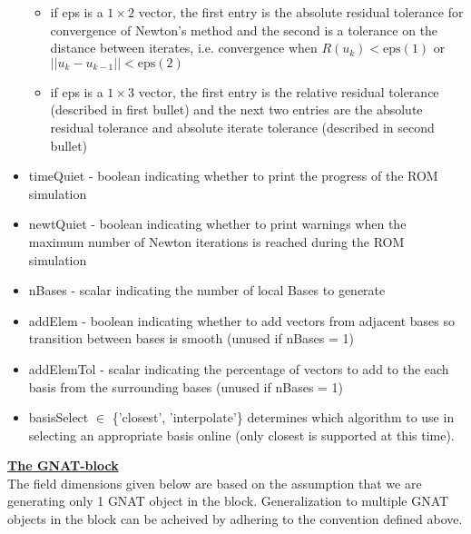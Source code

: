 \documentclass[notitlepage]{report}
\begin{document}
\begin{itemize}
\begin{itemize}
        \item if eps is a $1 \times 2$ vector, the first entry is the absolute residual tolerance for convergence of Newton's method and the second is a tolerance on the distance between iterates, i.e. convergence when $R(u_k) < \text{eps}(1)$ or $||u_{k} - u_{k-1}|| < \text{eps}(2)$
        \item if eps is a $1 \times 3$ vector, the first entry is the relative residual tolerance (described in first bullet) and the next two entries are the absolute residual tolerance and absolute iterate tolerance (described in second bullet)
      \end{itemize}
  \item timeQuiet - boolean indicating whether to print the progress of the ROM simulation
  \item newtQuiet - boolean indicating whether to print warnings when the maximum number of Newton iterations is reached during the ROM simulation
    \item nBases - scalar indicating the number of local Bases to generate
    \item addElem - boolean indicating whether to add vectors from adjacent bases so transition between bases is smooth (unused if nBases = 1)
    \item addElemTol - scalar indicating the percentage of vectors to add to the each basis from the surrounding bases (unused if nBases = 1)
    \item basisSelect $\in$ \{'closest', 'interpolate'\} determines which algorithm to use in selecting an appropriate basis online (only closest is supported at this time).
 \end{itemize}

\vspace{2mm}
\noindent \underline{\textbf{The GNAT-block}} \\
The field dimensions given below are based on the assumption that we are generating only 1 GNAT object in the block.  Generalization to multiple GNAT objects in the block can be acheived by adhering to the convention defined above.
\end{document}
